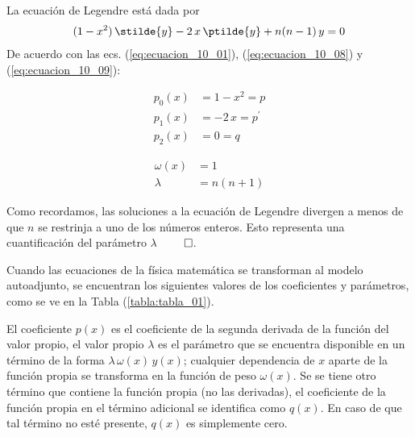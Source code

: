La ecuación de Legendre está dada por
\begin{align}
(1 - x^{2}) \, \stilde{y} - 2 \, x \, \ptilde{y} +  n(n -1) \, y = 0
\label{eq:ecuacion_10_09}
\end{align}
De acuerdo con las ecs. (\ref{eq:ecuacion_10_01}), (\ref{eq:ecuacion_10_08}) y (\ref{eq:ecuacion_10_09}):
\begin{center}
\begin{minipage}{4cm}
\begin{align*}
p_{0} (x) &= 1 - x^{2} = p \\
p_{1} (x) &= -2 \, x = p^{\prime} \\
p_{2} (x) &= 0 = q
\end{align*}
\end{minipage}
\hspace{2cm}
\begin{minipage}{4cm}
\begin{align*}
\omega (x) &= 1 \\
\lambda &= n (n + 1)
\end{align*}
\end{minipage}
\end{center}
Como recordamos, las soluciones a la ecuación de Legendre divergen a menos de que $n$ se restrinja a uno de los números enteros. Esto representa una cuantificación del parámetro $\lambda$ $\qed$.
\par
Cuando las ecuaciones de la física matemática se transforman al modelo autoadjunto, se encuentran los siguientes valores de los coeficientes y parámetros, como se ve en la Tabla (\ref{tabla:tabla_01}).
\par
El coeficiente $p(x)$ es el coeficiente de la segunda derivada de la función del valor propio, el valor propio $\lambda$ es el parámetro que se encuentra disponible en un término de la forma $\lambda \, \omega (x) \, y(x)$; cualquier dependencia de $x$ aparte de la función propia se transforma en la función de peso $\omega (x)$. Se se tiene otro término que contiene la función propia (no las derivadas), el coeficiente de la función propia en el término adicional se identifica como $q(x)$. En caso de que tal término no esté presente, $q(x)$ es simplemente cero.


